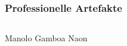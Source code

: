 \documentclass[aspectratio=169]{beamer}
\begin{document}
\begin{frame}
	\frametitle{Professionelle Artefakte}
	\begin{center}
	\begin{columns}
		\begin{column}{0.3\textwidth}
		Manolo Gamboa Naon
		\end{column}
		\hfill
		\begin{column}{0.3\textwidth}

\end{column}
\end{columns}
\end{center}
\end{frame}
\end{document}
